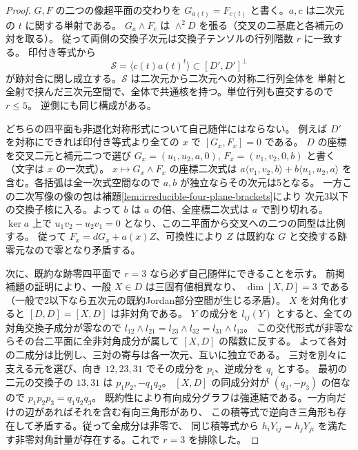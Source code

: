 \begin{proof}
$G,F$ の二つの像超平面の交わりを
$G_{a(t)}=F_{c(t)}$ と書く。$a,c$ は二次元の $t$ に関する単射である。
$G_a\wedge F_c$ は $\wedge^2D$ を張る（交叉の二基底と各補元の対を取る）。
従って両側の交換子次元は交換子テンソルの行列階数 $r$ に一致する。
印付き等式から
\[
 \mathcal S=\langle c(t)a(t)^t\rangle\subset [D',D']^\perp
\]
が跡対合に関し成立する。$\mathcal S$ は二次元から二次元への対称二行列全体を
単射と全射で挟んだ三次元空間で、全体で共通核を持つ。単位行列も直交するので $r\le5$。
逆側にも同じ構成がある。

どちらの四平面も非退化対称形式について自己随伴にはならない。
例えば $D'$ を対称にできれば印付き等式より全ての $x$ で $[G_x,F_x]=0$ である。
$D$ の座標を交叉二元と補元二つで選び
$G_x=(u_1,u_2,a,0)$, $F_x=(v_1,v_2,0,b)$ と書く（文字は $x$ の一次式）。
$x\mapsto G_x\wedge F_x$ の座標二次式は
$a\langle v_1,v_2,b\rangle+b\langle u_1,u_2,a\rangle$
を含む。各括弧は全一次式空間なので $a,b$ が独立ならその次元は5となる。
一方この二次写像の像の包は補題\ref{lem:irreducible-four-plane-brackets}により
次元3以下の交換子核に入る。よって $b$ は $a$ の倍、全座標二次式は $a$ で割り切れる。
$\ker a$ 上で $u_1v_2-u_2v_1=0$ となり、この二平面から交叉への二つの同型は比例する。
従って $F_x=dG_x+a(x)Z$、可換性により $Z$ は既約な $G$ と交換する跡零元なので零となり矛盾する。

次に、既約な跡零四平面で $r=3$ なら必ず自己随伴にできることを示す。
前掲補題の証明により、一般 $X\in D$ は三固有値相異なり、
$\dim[X,D]=3$ である（一般で2以下なら五次元の既約Jordan部分空間が生じる矛盾）。
$X$ を対角化すると $[D,D]=[X,D]$ は非対角である。
$Y$ の成分を $l_{ij}(Y)$ とすると、全ての対角交換子成分が零なので
$l_{12}\wedge l_{21}=l_{23}\wedge l_{32}=l_{31}\wedge l_{13}$。
この交代形式が非零ならその台二平面に全非対角成分が属して $[X,D]$ の階数に反する。
よって各対の二成分は比例し、三対の寄与は各一次元、互いに独立である。
三対を別々に支える元を選び、向き $12,23,31$ でその成分を $p_i$、逆成分を $q_i$ とする。
最初の二元の交換子の $13,31$ は $p_1p_2,-q_1q_2$。
$[X,D]$ の同成分対が $(q_3,-p_3)$ の倍なので $p_1p_2p_3=q_1q_2q_3$。
既約性により有向成分グラフは強連結である。一方向だけの辺があればそれを含む有向三角形があり、
この積等式で逆向き三角形も存在して矛盾する。従って全成分は非零で、
同じ積等式から $h_iY_{ij}=h_jY_{ji}$ を満たす非零対角計量が存在する。これで $r=3$ を排除した。


\end{proof}
